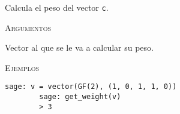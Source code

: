 \begin{description}[leftmargin=1em, font=\normalfont\ttfamily, style=nextline]
    \item[get\_weight(c)]
  
    Calcula el peso del vector \texttt{c}.
  
    \textsc{Argumentos}
    \begin{description}[font=\normalfont\ttfamily]
        \item[c] Vector al que se le va a calcular su peso.
    \end{description}

    \textsc{Ejemplos}
    \begin{lstlisting}[gobble=4]
        sage: v = vector(GF(2), (1, 0, 1, 1, 0))
        sage: get_weight(v)
        > 3
    \end{lstlisting}
\end{description}